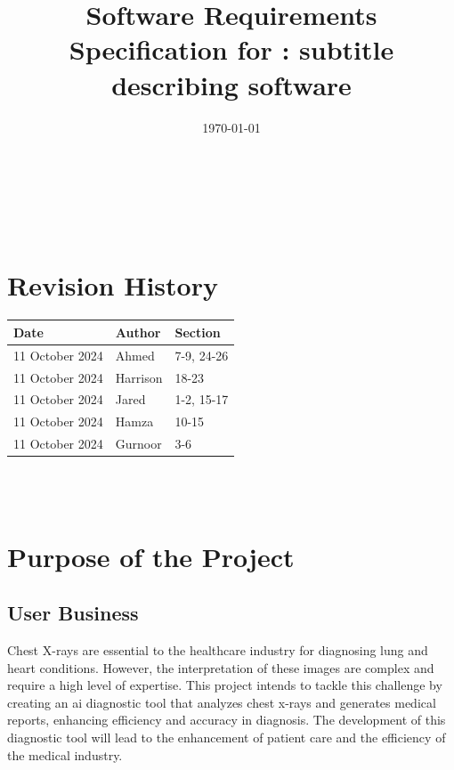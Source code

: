 \documentclass[12pt]{article}
\begin{document}
\title{Software Requirements Specification for \progname: subtitle describing software} 
\author{\authname}
\date{\today}
	
\maketitle

~\newpage


\tableofcontents

~\newpage

\section*{Revision History}

\begin{tabularx}{\textwidth}{p{3cm}p{2cm}X}
\toprule {\textbf{Date}} & {Author} & {Section}\\
\midrule
11 October 2024 & Ahmed & 7-9, 24-26 \\
11 October 2024 & Harrison & 18-23 \\
11 October 2024 & Jared & 1-2, 15-17 \\
11 October 2024 & Hamza & 10-15 \\
11 October 2024 & Gurnoor & 3-6 \\
\bottomrule
\end{tabularx}

~\\

~\newpage
\section{Purpose of the Project}
\subsection{User Business}
Chest X-rays are essential to the healthcare industry for diagnosing lung and heart conditions. 
However, the interpretation of these images are complex and require a high level of expertise. 
This project intends to tackle this challenge by creating an ai diagnostic tool that analyzes 
chest x-rays and generates medical reports, enhancing efficiency and accuracy in diagnosis. The 
development of this diagnostic tool will lead to the enhancement of patient care and the 
efficiency of the medical industry. 
\end{document}
